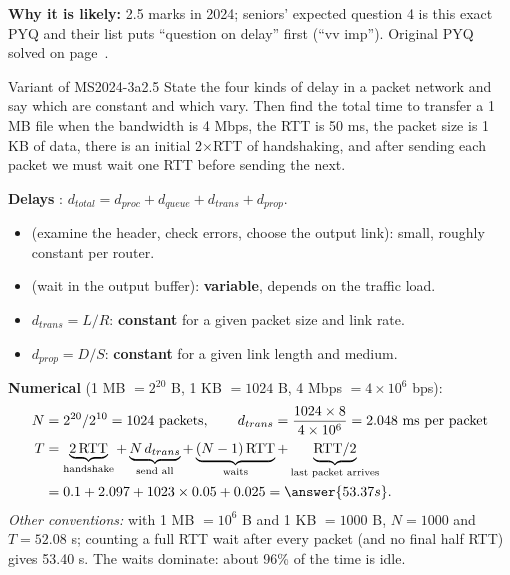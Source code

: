 \textbf{Why it is likely:} 2.5 marks in 2024; seniors' expected question 4 is this exact PYQ and their list puts ``question on delay'' first (``vv imp''). Original PYQ solved on page~\pageref{q:MS2024-3a}.

\begin{question}{Variant of MS2024-3a}{2.5}
State the four kinds of delay in a packet network and say which are constant and which vary. Then find the total time to transfer a 1 MB file when the bandwidth is 4 Mbps, the RTT is 50 ms, the packet size is 1 KB of data, there is an initial 2$\times$RTT of handshaking, and after sending each packet we must wait one RTT before sending the next.
\end{question}
\begin{solution}
\textbf{Delays} : $d_{total}=d_{proc}+d_{queue}+d_{trans}+d_{prop}$.
\begin{itemize}
\item {} (examine the header, check errors, choose the output link): small, roughly constant per router.
\item {} (wait in the output buffer): \textbf{variable}, depends on the traffic load.
\item {} $d_{trans}=L/R$: \textbf{constant} for a given packet size and link rate.
\item {} $d_{prop}=D/S$: \textbf{constant} for a given link length and medium.
\end{itemize}
\textbf{Numerical} (1 MB $=2^{20}$ B, 1 KB $=1024$ B, 4 Mbps $=4\times10^{6}$ bps):
\begin{align*}
N &= 2^{20}/2^{10} = 1024 \text{ packets}, \qquad d_{trans} = \frac{1024\times8}{4\times10^{6}} = 2.048 \text{ ms per packet}\\
T &= \underbrace{2\,\text{RTT}}_{\text{handshake}} + \underbrace{N\,d_{trans}}_{\text{send all}} + \underbrace{(N-1)\,\text{RTT}}_{\text{waits}} + \underbrace{\text{RTT}/2}_{\text{last packet arrives}}\\
  &= 0.1 + 2.097 + 1023\times0.05 + 0.025 = \answer{53.37 s}.
\end{align*}
\textit{Other conventions:} with 1 MB $=10^{6}$ B and 1 KB $=1000$ B, $N=1000$ and $T=52.08$ s; counting a full RTT wait after every packet (and no final half RTT) gives 53.40 s. The waits dominate: about 96\% of the time is idle.
\end{solution}

